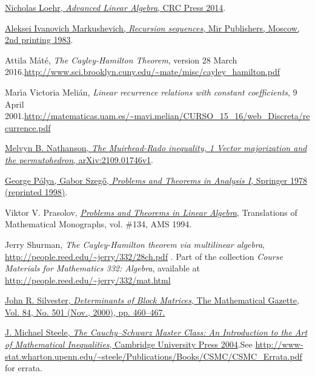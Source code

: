 \documentclass[numbers=enddot,12pt,final,onecolumn,notitlepage]{scrartcl}%
\numberwithin{exer}{subsection}
\theoremstyle{definition}
\begin{document}
\begin{thebibliography}{99999999}
%
\href{https://elblogdecontar.files.wordpress.com/2017/01/ebookdaraz-advanced-linear-algebra.pdf}{Nicholas
Loehr, \textit{Advanced Linear Algebra}, CRC Press 2014}.

%
\href{https://archive.org/details/recursion-sequences}{Aleksei Ivanovich
Markushevich, \textit{Recursion sequences}, Mir Publishers, Moscow, 2nd
printing 1983}.

Attila M\'{a}t\'{e}, \textit{The Cayley-Hamilton
Theorem}, version 28 March 2016.\newline\url{http://www.sci.brooklyn.cuny.edu/~mate/misc/cayley_hamilton.pdf}

Mar\'{\i}a Victoria Meli\'{a}n, \textit{Linear
recurrence relations with constant coefficients}, 9 April 2001.\newline\url{http://matematicas.uam.es/~mavi.melian/CURSO_15_16/web_Discreta/recurrence.pdf}

\href{https://arxiv.org/abs/2109.01746v1}{Melvyn
B. Nathanson, \textit{The Muirhead-Rado inequality, 1 Vector majorization and
the permutohedron}, arXiv:2109.01746v1}.

%
\href{https://doi.org/10.1007/978-3-642-61983-0}{George P\'{o}lya, Gabor
Szeg\H{o}, \textit{Problems and Theorems in Analysis I}, Springer 1978
(reprinted 1998)}.

Viktor V. Prasolov,
\textit{\href{http://www2.math.su.se/~mleites/books/prasolov-1994-problems.pdf}{\textit{Problems
and Theorems in Linear Algebra}}}, Translations of Mathematical Monographs,
vol. \#134, AMS 1994.

Jerry Shurman, \textit{The Cayley-Hamilton theorem
via multilinear algebra}, \url{http://people.reed.edu/~jerry/332/28ch.pdf} .
Part of the collection \textit{Course Materials for Mathematics 332: Algebra},
available at \url{http://people.reed.edu/~jerry/332/mat.html}

%
\href{https://web.archive.org/web/20140505161153/http://www.mth.kcl.ac.uk/~jrs/gazette/blocks.pdf}{John
R. Silvester, \textit{Determinants of Block Matrices}, The Mathematical
Gazette, Vol. 84, No. 501 (Nov., 2000), pp. 460--467.}

%
\href{http://www.ma.huji.ac.il/~ehudf/courses/Ineq09/The Cauchy-Schwarz Master Class .pdf}{J.
Michael Steele, \textit{The Cauchy--Schwarz Master Class: An Introduction to
the Art of Mathematical Inequalities}, Cambridge University Press
2004}.\newline See
\url{http://www-stat.wharton.upenn.edu/~steele/Publications/Books/CSMC/CSMC_Errata.pdf}
for errata.


\end{thebibliography}
\end{document}
